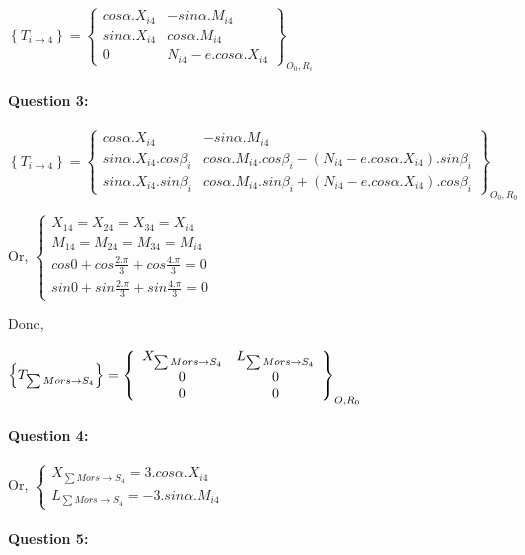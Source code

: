 $\left\{T_{i\rightarrow 4}\right\}=\left\{\begin{array}{cc}
cos\alpha.X_{i4} & -sin\alpha.M_{i4} \\ sin\alpha.X_{i4} & cos\alpha.M_{i4} \\  0 & N_{i4}-e.cos\alpha.X_{i4}
\end{array}\right\}_{O_0,R_i}$

\paragraph{Question 3:}

$\left\{T_{i\rightarrow 4}\right\}=\left\{\begin{array}{cc}
cos\alpha.X_{i4} & -sin\alpha.M_{i4} \\ sin\alpha.X_{i4}.cos\beta_i & cos\alpha.M_{i4}.cos\beta_i-(N_{i4}-e.cos\alpha.X_{i4}).sin\beta_i \\ sin\alpha.X_{i4}.sin\beta_i & cos\alpha.M_{i4}.sin\beta_i+(N_{i4}-e.cos\alpha.X_{i4}).cos\beta_i
\end{array}\right\}_{O_0,R_0}$

Or, $\left\{\begin{array}{l}
X_{14}=X_{24}=X_{34}=X_{i4} \\
M_{14}=M_{24}=M_{34}=M_{i4} \\
cos0+cos\frac{2.\pi}{3}+cos\frac{4.\pi}{3}=0 \\
sin0+sin\frac{2.\pi}{3}+sin\frac{4.\pi}{3}=0
\end{array}\right.$

Donc, 

$\left\{T_{\sum Mors \rightarrow S_4}\right\}=\left\{
  \begin{array}{c c}
  X_{\sum Mors \rightarrow S_4} & L_{\sum Mors \rightarrow S_4} \\
  0 & 0 \\
  0 & 0
  \end{array}\right\}_{O,R_0}$

\paragraph{Question 4:}

Or, $\left\{\begin{array}{l}
X_{\sum Mors \rightarrow S_4}=3.cos\alpha.X_{i4} \\
L_{\sum Mors \rightarrow S_4}=-3.sin\alpha.M_{i4}
\end{array}\right.$

\paragraph{Question 5:}

